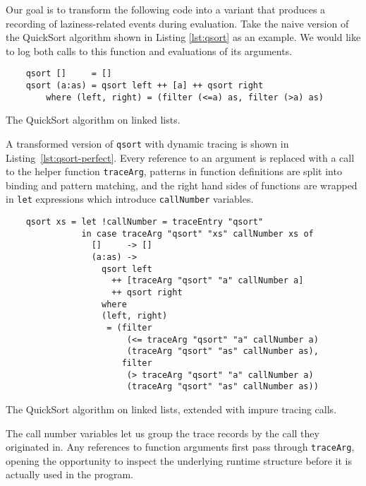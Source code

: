 \documentclass[thesis=B,english]{FITthesis}[2019/12/23]
\newcommand{\hsIdent}[1]{\texttt{#1}}
\newcommand{\hsCode}[1]{\texttt{#1}}
\begin{document}
Our goal is to transform the following code into a variant that produces a
recording of laziness-related events during evaluation. Take the naive version
of the QuickSort algorithm shown in Listing \ref{lst:qsort} as an example. We
would like to log both calls to this function and evaluations of its arguments.

\begin{listing}[h]
	\centering
	\begin{verbatim}
	qsort []     = []
	qsort (a:as) = qsort left ++ [a] ++ qsort right
	    where (left, right) = (filter (<=a) as, filter (>a) as)
	\end{verbatim}
	\caption{The QuickSort algorithm on linked lists.}
	\label{lst:qsort}
\end{listing}

A transformed version of \hsIdent{qsort} with dynamic tracing is shown in
Listing~\ref{lst:qsort-perfect}. Every reference to an argument is replaced
with a call to the helper function \hsIdent{traceArg}, patterns in function
definitions are split into binding and pattern matching, and the right hand
sides of functions are wrapped in \hsCode{let} expressions which introduce
\hsIdent{callNumber} variables.

\begin{listing}[h]
	\centering
	\begin{verbatim}
	qsort xs = let !callNumber = traceEntry "qsort"
	           in case traceArg "qsort" "xs" callNumber xs of
	             []     -> []
	             (a:as) ->
	               qsort left
	                 ++ [traceArg "qsort" "a" callNumber a]
	                 ++ qsort right
	               where
	               (left, right)
	                = (filter
	                    (<= traceArg "qsort" "a" callNumber a)
	                    (traceArg "qsort" "as" callNumber as),
	                   filter
	                    (> traceArg "qsort" "a" callNumber a)
	                    (traceArg "qsort" "as" callNumber as))
	\end{verbatim}
	\caption[The QuickSort algorithm, rewritten.]{The QuickSort algorithm on
	linked lists, extended with impure tracing calls.}
	\label{lst:qsort-perfect}
\end{listing}

The call number variables let us group the trace records by the call they
originated in. Any references to function arguments first pass through
\hsIdent{traceArg}, opening the opportunity to inspect the underlying runtime
structure before it is actually used in the program.
\end{document}
